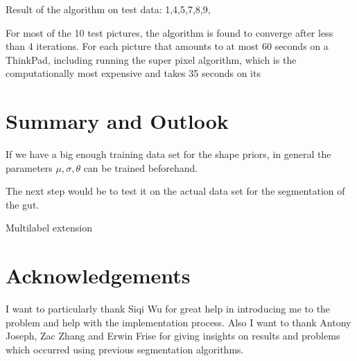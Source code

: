 \documentclass{article} %
\begin{document}
\begin{figure}[htbp]
\centering
{}
\end{figure}

Result of the algorithm on test data:
1,4,5,7,8,9,

For most of the 10 test pictures, the algorithm is found to converge after less than 4 iterations. For each picture that amounts to at most 60 seconds on a ThinkPad, including running the super pixel algorithm, which is the computationally most expensive and takes 35 seconds on its 


\section{Summary and Outlook}
If we have a big enough training data set for the shape priors, in general the parameters $\mu, \sigma, \theta$ can be trained beforehand.

The next step would be to test it on the actual data set for the segmentation of the gut. 

Multilabel extension

\section{Acknowledgements}
I want to particularly thank Siqi Wu for great help in introducing me to the problem and help with the implementation process. Also I want to thank Antony Joseph, Zac Zhang and Erwin Frise for giving insights on results and problems which occurred using previous segmentation algorithms.

\FloatBarrier
\vskip 0.2in
\nocite{*}



\begin{appendices}

\end{appendices}
\end{document}
